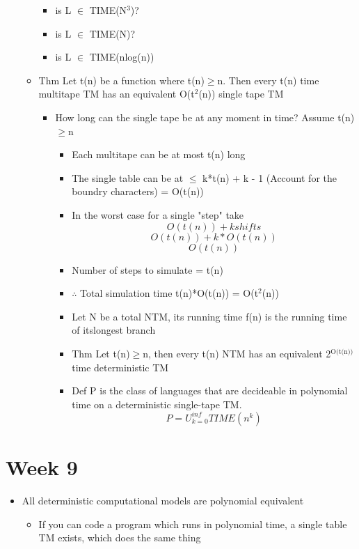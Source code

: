 \documentclass[11pt]{article}
\begin{document}
\begin{itemize}
\begin{itemize}
\begin{itemize}
\item is L \(\in\) TIME(N\(^{\text{3}}\))?
\item is L \(\in\) TIME(N)?
\item is L \(\in\) TIME(nlog(n))
\end{itemize}
\item Thm
Let t(n) be a function where t(n)\(\ge\)n. Then every t(n) time multitape TM has an equivalent O(t\(^{\text{2}}\)(n)) single tape TM
\begin{itemize}
\item How long can the single tape be at any moment in time? Assume t(n)\(\ge\)n
\begin{itemize}
\item Each multitape can be at most t(n) long
\item The single table can be at \(\le\) k*t(n) + k - 1 (Account for the boundry characters) = O(t(n))
\item In the worst case for a single "step" take
\[ O(t(n)) + k shifts \]
\[ O(t(n)) + k*O(t(n)) \]
\[ O(t(n)) \]
\item Number of steps to simulate = t(n)
\item \(\therefore\) Total simulation time t(n)*O(t(n)) = O(t\(^{\text{2}}\)(n))
\item Let N be a total NTM, its running time f(n) is the running time of itslongest branch
\item Thm
Let t(n)\(\ge\)n, then every t(n) NTM has an equivalent 2\(^{\text{O(t(n))}}\) time deterministic TM
\item Def
P is the class of languages that are decideable in polynomial time on a deterministic single-tape TM. 
\[ P = U^{inf}_{k = 0} TIME(n^k) \]
\end{itemize}
\end{itemize}
\end{itemize}
\end{itemize}
\section{Week 9}
\label{sec:org3d098ac}
\begin{itemize}
\item All deterministic computational models are polynomial equivalent
\begin{itemize}
\item If you can code a program which runs in polynomial time, a single table TM exists, which does the same thing
\end{itemize}
\end{itemize}
\end{document}
